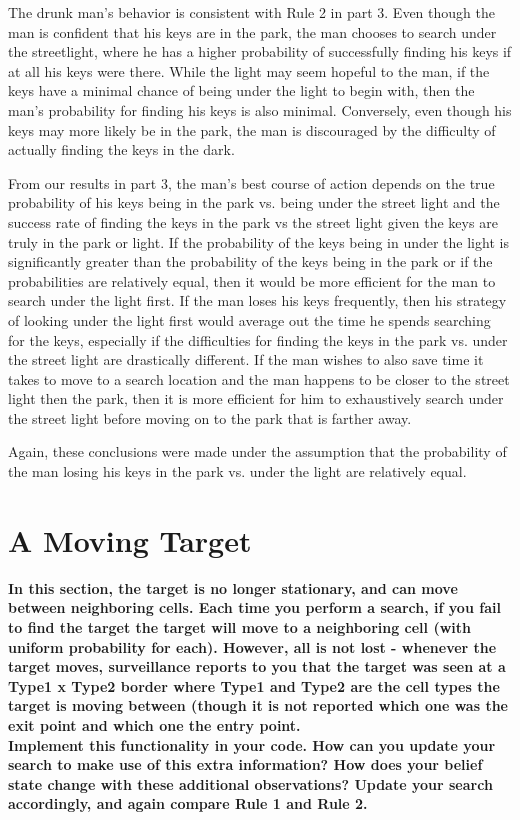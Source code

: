 \documentclass[a4paper]{article}
\begin{document}
\begin{enumerate}
The drunk man's behavior is consistent with Rule 2 in part 3. Even though the man is confident that his keys are in the park, the man chooses to search under the streetlight, where he has a higher probability of successfully finding his keys if at all his keys were there. While the light may seem hopeful to the man, if the keys have a minimal chance of being under the light to begin with, then the man's probability for finding his keys is also minimal. Conversely, even though his keys may more likely be in the park, the man is discouraged by the difficulty of actually finding the keys in the dark.

From our results in part 3, the man's best course of action depends on the true probability of his keys being in the park vs. being under the street light and the success rate of finding the keys in the park vs the street light given the keys are truly in the park or light. If the probability of the keys being in under the light is significantly greater than the probability of the keys being in the park or if the probabilities are relatively equal, then it would be more efficient for the man to search under the light first. If the man loses his keys frequently, then his strategy of looking under the light first would average out the time he spends searching for the keys, especially if the difficulties for finding the keys in the park vs. under the street light are drastically different. If the man wishes to also save time it takes to move to a search location and the man happens to be closer to the street light then the park, then it is more efficient for him to exhaustively search under the street light before moving on to the park that is farther away. 

Again, these conclusions were made under the assumption that the probability of the man losing his keys in the park vs. under the light are relatively equal.
\end{enumerate}
\pagebreak
\section{\textbf{A Moving Target}}
\textbf{In this section, the target is no longer stationary, and can move between neighboring cells. Each time you perform a search, if you fail to find the target the target will move to a neighboring cell (with uniform probability for each). However, all is not lost - whenever the target moves, surveillance reports to you that the target was seen at a Type1
x Type2 border where Type1 and Type2 are the cell types the target is moving between (though it is not reported which one was the exit point and which one the entry point.\\
Implement this functionality in your code. How can you update your search to make use of this extra information? How does your belief state change with these additional observations? Update your search accordingly, and again compare Rule 1 and Rule 2.}
\end{document}
